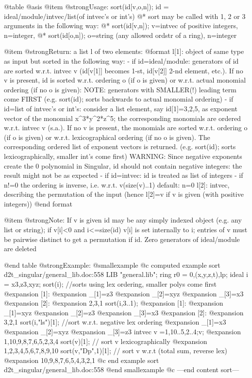 @table @asis
@item @strong{Usage:}
sort(id[v,o,n]); id = ideal/module/intvec/list(of intvec's or int's)
@* sort may be called with 1, 2 or 3 arguments in the following way:
@* sort(id[v,n]); v=intvec of positive integers, n=integer,
@* sort(id[o,n]); o=string (any allowed ordstr of a ring), n=integer

@item @strong{Return:}
a list l of two elements:
@format
        l[1]: object of same type as input but sorted in the following way:
           - if id=ideal/module: generators of id are sorted w.r.t. intvec v
             (id[v[1]] becomes 1-st, id[v[2]]  2-nd element, etc.). If no v is
             present, id is sorted w.r.t. ordering o (if o is given) or w.r.t.
             actual monomial ordering (if no o is given):
             NOTE: generators with SMALLER(!) leading term come FIRST
             (e.g. sort(id); sorts backwards to actual monomial ordering)
           - if id=list of intvec's or int's: consider a list element, say
             id[1]=3,2,5, as exponent vector of the monomial x^3*y^2*z^5;
             the corresponding monomials are ordered w.r.t. intvec v (s.a.).
             If no v is present, the monomials are sorted w.r.t. ordering o
             (if o is given) or w.r.t. lexicographical ordering (if no o is
             given). The corresponding ordered list of exponent vectors is
             returned.
             (e.g. sort(id); sorts lexicographically, smaller int's come first)
             WARNING: Since negative exponents create the 0 polynomial in
             Singular, id should not contain negative integers: the result
             might not be as expected
           - if id=intvec: id is treated as list of integers
           - if n!=0 the ordering is inverse, i.e. w.r.t. v(size(v)..1)
             default: n=0
         l[2]: intvec, describing the permutation of the input (hence l[2]=v
             if v is given (with positive integers))
@end format

@item @strong{Note:}
If v is given id may be any simply indexed object (e.g. any list or
string); if v[i]<0 and i<=size(id) v[i] is set internally to i;
entries of v must be pairwise distinct to get a permutation if id.
Zero generators of ideal/module are deleted

@end table
@strong{Example:}
@smallexample
@c computed example sort d2t_singular/general_lib.doc:558 
LIB "general.lib";
ring r0 = 0,(x,y,z,t),lp;
ideal i = x3,z3,xyz;
sort(i);            //sorts using lex ordering, smaller polys come first
@expansion{} [1]:
@expansion{}    _[1]=z3
@expansion{}    _[2]=xyz
@expansion{}    _[3]=x3
@expansion{} [2]:
@expansion{}    2,3,1
sort(i,3..1);
@expansion{} [1]:
@expansion{}    _[1]=xyz
@expansion{}    _[2]=z3
@expansion{}    _[3]=x3
@expansion{} [2]:
@expansion{}    3,2,1
sort(i,"ls")[1];     //sort w.r.t. negative lex ordering
@expansion{} _[1]=x3
@expansion{} _[2]=xyz
@expansion{} _[3]=z3
intvec v =1,10..5,2..4;v;
@expansion{} 1,10,9,8,7,6,5,2,3,4
sort(v)[1];          // sort v lexicographically
@expansion{} 1,2,3,4,5,6,7,8,9,10
sort(v,"Dp",1)[1];   // sort v w.r.t (total sum, reverse lex)
@expansion{} 10,9,8,7,6,5,4,3,2,1
@c end example sort d2t_singular/general_lib.doc:558
@end smallexample
@c ---end content sort---

